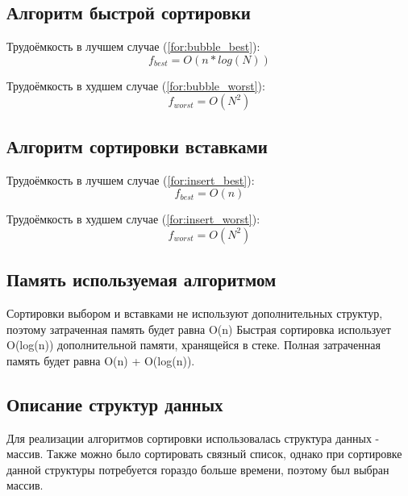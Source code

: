 \subsection{Алгоритм быстрой сортировки}

Трудоёмкость в лучшем случае (\ref{for:bubble_best}):
\begin{equation}
    \label{for:bubble_best}
    f_{best} = O(n * log(N))
\end{equation}

Трудоёмкость в худшем случае (\ref{for:bubble_worst}):
\begin{equation}
    \label{for:bubble_worst}
    f_{worst} = O(N^2)
\end{equation}



\subsection{Алгоритм сортировки вставками}

Трудоёмкость в лучшем случае (\ref{for:insert_best}):
\begin{equation}
    \label{for:insert_best}
    f_{best} = O(n)
\end{equation}

Трудоёмкость в худшем случае (\ref{for:insert_worst}):
\begin{equation}
    \label{for:insert_worst}
    f_{worst} = O(N^2)
\end{equation}

\subsection{Память используемая алгоритмом}

Сортировки выбором и вставками не используют дополнительных структур, поэтому затраченная память будет равна O(n)
Быстрая сортировка использует O(log(n)) дополнительной памяти, хранящейся в стеке. Полная затраченная память будет равна O(n) + O(log(n)).


\subsection{Описание структур данных}

Для реализации алгоритмов сортировки использовалась структура данных - массив. Также можно было сортировать связный список, однако при сортировке данной структуры потребуется гораздо больше времени, поэтому был выбран массив.

